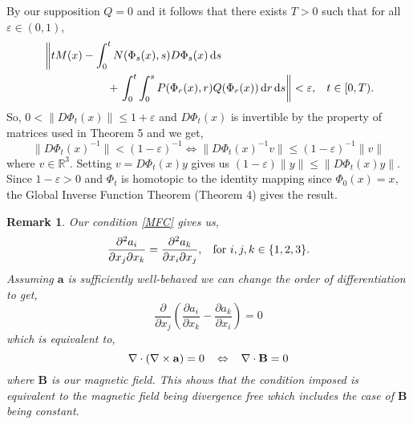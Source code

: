 \documentclass[a4paper,12pt,draft]{report}
\newtheorem{remark}{Remark}
\begin{document}
{By our supposition $Q = 0$ and it follows that there exists $T > 0$ such that for all $\varepsilon\in(0, 1)$,
\begin{align}
& \left\|tM(x) - \int_0^tN(\Phi_s(x), s)D\Phi_s(x)\,\mathrm{d}s\right.\nonumber\\
& \hspace{2cm} + \left.\int_0^t\int_0^sP(\Phi_r(x), r)Q(\Phi_r(x))\,\mathrm{d}r\,\mathrm{d}s\right\| < \varepsilon, \hspace{0.3cm} t \in [0, T).\nonumber
\end{align}
So, $0 < \|D\Phi_t(x)\| \le 1 + \varepsilon$ and $D\Phi_t(x)$ is invertible by the property of matrices used in Theorem 5 and we get,
$$
\|D\Phi_t(x)^{-1}\| < (1 - \varepsilon)^{-1} \Leftrightarrow \|D\Phi_t(x)^{-1}v\| \le (1 - \varepsilon)^{-1}\|v\|
$$
where $v \in \mathbb{R}^3$. Setting $v = D\Phi_t(x)y$ gives us $(1 - \varepsilon)\|y\| \le \|D\Phi_t(x)y\|$.  Since $1 - \varepsilon > 0$ and $\Phi_t$ is homotopic to the identity mapping since $\Phi_0(x) = x$, the Global Inverse Function Theorem (Theorem 4) gives the result.

\qedhere
}

\begin{remark}
{
Our condition \eqref{MFC} gives us,
$$
\frac{\partial^2 a_i}{\partial x_j \partial x_k} = \frac{\partial^2 a_k}{\partial x_i \partial x_j}, \hspace{0.3cm} \text{for } i, j, k \in \{1, 2, 3\}.
$$
Assuming $\mathbf{a}$ is sufficiently well-behaved we can change the order of differentiation to get,
$$
\frac{\partial}{\partial x_j}\left(\frac{\partial a_i}{\partial x_k} - \frac{\partial a_k}{\partial x_i}\right) = 0
$$
which is equivalent to,
$$
\nabla\cdot\left(\nabla\times\mathbf{a}\right) = 0 \hspace{0.3cm} \Leftrightarrow \hspace{0.3cm} \nabla\cdot\mathbf{B} = 0
$$
where $\mathbf{B}$ is our magnetic field.  This shows that the condition imposed is equivalent to the magnetic field being divergence free which includes the case of $\mathbf{B}$ being constant.
}
\end{remark}
\end{document}
